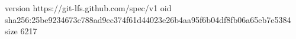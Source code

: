 version https://git-lfs.github.com/spec/v1
oid sha256:25be9234673c788ad9ec374f61d44023e26b4aa95f6b04df8fb06a65eb7e5384
size 6217
